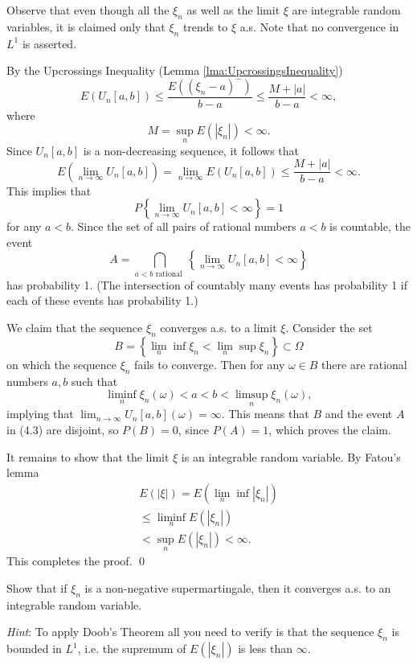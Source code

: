 \begin{Remark}
\label{rem:MartingaleConvergenceRemark2}
Observe that even though all the $\xi_{n}$ as well as the limit $\xi$ are integrable random variables, it is claimed only that $\xi_{n}$ trends to $\xi$ a.s. Note that no convergence in $L^{1}$ is asserted.
\end{Remark}

\begin{Proof}
By the Upcrossings Inequality (Lemma \ref{lma:UpcrossingsInequality})
\[
E \left(U_{n}[a, b]\right) \leq \frac{E \left(\left(\xi_{n} - a\right)^{-}\right)}{b - a} \leq \frac{M + |a|}{b - a} < \infty,
\]
where
\[
M = \sup_{n} E (| \xi_{n} |) < \infty .
\]
Since $U_{n}[a,b]$ is a non-decreasing sequence, it follows that
\[
E \left(\lim_{n \rightarrow \infty} U_{n}[a, b]\right) = \lim_{n \rightarrow \infty} E (U_{n}[a, b]) \leq \frac{M + |a|}{b - a} < \infty .
\]
This implies that
\[
P \left\{\lim_{n \rightarrow \infty} U_{n}[a, b] < \infty \right\} = 1
\]
for any $a < b$. Since the set of all pairs of rational numbers $a < b$ is countable, the event
\[
A = \bigcap_{a < b \text{ rational }} \left\{\lim_{n \rightarrow \infty} U_{n}[a, b] < \infty \right\} \tag{4.3}
\]
has probability 1. (The intersection of countably many events has probability 1 if each of these events has probability 1.)

We claim that the sequence $\xi_{n}$ converges a.s. to a limit $\xi$. Consider the set
\[
B = \left\{\lim_{n} \inf \xi_{n} < \lim_{n} \sup \xi_{n} \right\} \subset \Omega
\]
on which the sequence $\xi_{n}$ fails to converge. Then for any $\omega \in B$ there are rational numbers $a, b$ such that
\[
\liminf_{n} \xi_{n}(\omega) < a < b < \limsup_{n} \xi_{n}(\omega),
\]
implying that $\lim_{n\to \infty}U_n[a,b](\omega) = \infty$. This means that $B$ and the event $A$ in (4.3) are disjoint, so $P(B) = 0$, since $P(A) = 1$, which proves the claim.

It remains to show that the limit $\xi$ is an integrable random variable. By Fatou's lemma
\[
\begin{array}{l}
E (| \xi |) = E \left(\lim_{n} \inf | \xi_{n} |\right) \\
\leq \operatorname*{liminf}_{n} E (| \xi_{n} |) \\
< \sup_{n} E (| \xi_{n} |) < \infty .
\end{array}
\]
This completes the proof. \qed
\end{Proof}

\begin{Exercise}
\label{ex:NonNegativeSupermartingaleConvergence}
Show that if $\xi_{n}$ is a non-negative supermartingale, then it converges a.s. to an integrable random variable.

\textit{Hint}: To apply Doob's Theorem all you need to verify is that the sequence $\xi_{n}$ is bounded in $L^{1}$, i.e. the supremum of $E(|\xi_n|)$ is less than $\infty$.
\end{Exercise}

